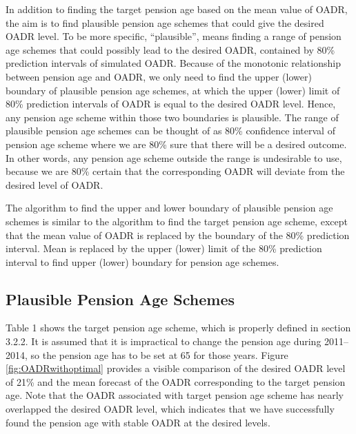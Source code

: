 \documentclass[11pt,a4paper,]{article}
\begin{document}
In addition to finding the target pension age based on the mean value of OADR, the aim is to find plausible pension age schemes that could give the desired OADR level. To be more specific, ``plausible'', means finding a range of pension age schemes that could possibly lead to the desired OADR, contained by 80\% prediction intervals of simulated OADR. Because of the monotonic relationship between pension age and OADR, we only need to find the upper (lower) boundary of plausible pension age schemes, at which the upper (lower) limit of 80\% prediction intervals of OADR is equal to the desired OADR level. Hence, any pension age scheme within those two boundaries is plausible. The range of plausible pension age schemes can be thought of as 80\% confidence interval of pension age scheme where we are 80\% sure that there will be a desired outcome. In other words, any pension age scheme outside the range is undesirable to use, because we are 80\% certain that the corresponding OADR will deviate from the desired level of OADR.

The algorithm to find the upper and lower boundary of plausible pension age schemes is similar to the algorithm to find the target pension age scheme, except that the mean value of OADR is replaced by the boundary of the 80\% prediction interval. Mean is replaced by the upper (lower) limit of the 80\% prediction interval to find upper (lower) boundary for pension age schemes.

\hypertarget{plausible-pension-age-schemes}{%
\subsection{Plausible Pension Age Schemes}\label{plausible-pension-age-schemes}}

Table 1 shows the target pension age scheme, which is properly defined in section 3.2.2. It is assumed that it is impractical to change the pension age during 2011--2014, so the pension age has to be set at 65 for those years. Figure \ref{fig:OADRwithoptimal} provides a visible comparison of the desired OADR level of 21\% and the mean forecast of the OADR corresponding to the target pension age. Note that the OADR associated with target pension age scheme has nearly overlapped the desired OADR level, which indicates that we have successfully found the pension age with stable OADR at the desired levels.
\end{document}
